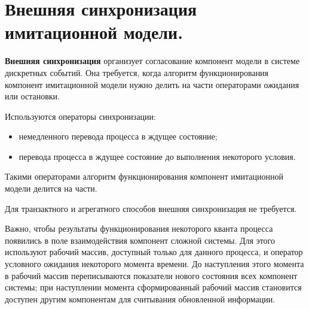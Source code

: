 \section{Внешняя синхронизация имитационной модели.}

\textbf{Внешняя синхронизация} организует согласование компонент модели в системе дискретных событий. Она требуется, когда алгоритм функционирования компонент имитационной модели нужно делить на части операторами ожидания или остановки.

Используются операторы синхронизации:
\begin{itemize}
  \item немедленного перевода процесса в ждущее состояние;
  \item перевода процесса в ждущее состояние до выполнения некоторого условия.
\end{itemize}

Такими операторами алгоритм функционирования компонент имитационной модели делится на части.

Для транзактного и агрегатного способов внешняя синхронизация не требуется.

Важно, чтобы результаты функционирования некоторого кванта процесса появились в поле взаимодействия компонент сложной системы. Для этого используют рабочий массив, доступный только для данного процесса, и оператор условного ожидания некоторого момента времени. До наступления этого момента в рабочий массив переписываются показатели нового состояния всех компонент системы; при наступлении момента сформированный рабочий массив становится доступен другим компонентам для считывания обновленной информации.

\clearpage
